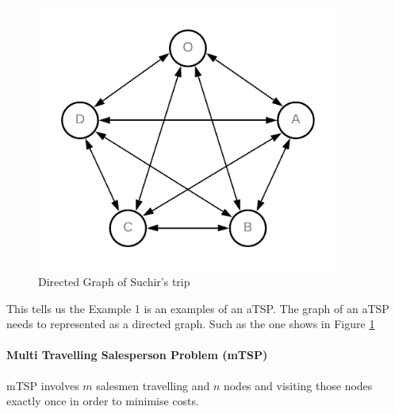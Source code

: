 \documentclass[a4paper]{article}
\begin{document}
\begin{figure}[H]
        \centering
        \includegraphics[width=100mm,scale=0.5]{images/suchirGraph.png}
        \caption{Directed Graph of Suchir's trip}
        \label{fig:suchirGraph}
    \end{figure}
This tells us the Example 1 is an examples of an aTSP. The graph of an aTSP needs to represented as a directed graph. Such as the one shows in Figure \ref{fig:suchirGraph}
\paragraph*{Multi Travelling Salesperson Problem (mTSP)} mTSP involves $m$ salesmen travelling and $n$ nodes and visiting those nodes exactly once in order to minimise costs.
\end{document}
